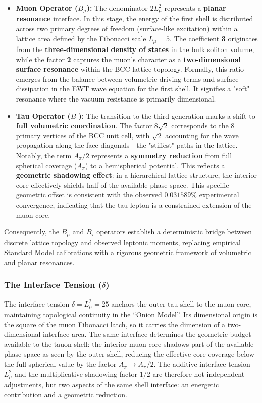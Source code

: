 \documentclass[10pt,a4paper]{article}
\begin{document}
\begin{itemize}
	\item \textbf{Muon Operator ($B_{\mu}$):} 
	The denominator $2 L_{\mu}^2$ represents a \textbf{planar resonance} interface. 
	In this stage, the energy of the first shell is distributed across 
	two primary degrees of freedom (surface-like excitation) within a lattice 
	area defined by the Fibonacci scale $L_{\mu}=5$. 
	The coefficient \textbf{3} originates from the \textbf{three-dimensional density 
		of states} in the bulk soliton volume, while the factor \textbf{2} captures the 
	muon’s character as a \textbf{two-dimensional surface resonance} within the 
	BCC lattice topology. Formally, this ratio emerges from the balance between 
	volumetric driving terms and surface dissipation in the EWT wave equation 
	for the first shell. It signifies a "soft" resonance where the vacuum 
	resistance is primarily dimensional.
	
	\item \textbf{Tau Operator ($B_{\tau}$):} 
	The transition to the third generation marks a shift to \textbf{full volumetric 
		coordination}. The factor \textbf{$8\sqrt{2}$} corresponds to the 8 primary 
	vertices of the BCC unit cell, with $\sqrt{2}$ accounting for the wave 
	propagation along the face diagonals—the "stiffest" paths in the lattice. 
	Notably, the term \textbf{$A_{\pi}/2$} represents a \textbf{symmetry reduction} 
	from full spherical coverage ($A_{\pi}$) to a hemispherical potential. 
	This reflects a \textbf{geometric shadowing effect}: in a hierarchical lattice 
	structure, the interior core effectively shields half of the available phase 
	space. This specific geometric offset is consistent with the observed $0.031589\%$ experimental convergence, indicating that the 
	tau lepton is a constrained extension of the muon core.
\end{itemize}

Consequently, the $B_{\mu}$ and $B_{\tau}$ operators establish a deterministic bridge between discrete lattice topology and observed leptonic moments, replacing empirical Standard Model calibrations with a rigorous geometric framework of volumetric and planar resonances.

\subsubsection*{The Interface Tension ($\delta$)}

The interface tension $\delta = L_\mu^2 = 25$ anchors the outer tau
shell to the muon core, maintaining topological continuity in the
``Onion Model''. Its dimensional origin is the square of the muon
Fibonacci latch, so it carries the dimension of a two-dimensional
interface area. The same interface
determines the geometric budget available to the tauon shell: the
interior muon core shadows part of the available phase space as seen
by the outer shell, reducing the effective core coverage below the
full spherical value by the factor $A_\pi \to A_\pi/2$. The additive
interface tension $L_\mu^2$ and the multiplicative shadowing factor
$1/2$ are therefore not independent adjustments, but two aspects of
the same shell interface: an energetic contribution and a geometric
reduction.
\end{document}
